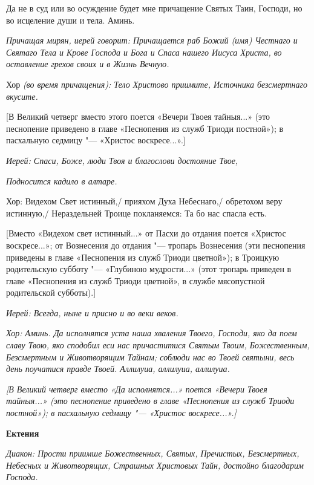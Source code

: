   Да не в суд или во осуждение будет мне причащение Святых Таин, Господи, но во исцеление души и тела. Аминь.


\medskip


 


\itshape  Причащая мирян, иерей говори\normalfont{}т: Причащается раб Божий (имя) Честнаго и Святаго Тела и Крове Господа и Бога и Спаса нашего Иисуса Христа, во оставление грехов своих и в Жизнь Вечную. 


Хор \itshape (во время причащения)\normalfont{}: Тело Христово приимите, Источника безсмертнаго вкусите.


 [В Великий четверг вместо этого поется «Вечери Твоея тайныя...» (это песнопение приведено в главе «Песнопения из служб Триоди постной»); в пасхальную седмицу "--- «Христос воскресе...».]


 \itshape Иерей:\normalfont{} Спаси, Боже, люди Твоя и благослови достояние Твое, 


\itshape Подносится кадило в алтаре.\normalfont{} 


      Хор: Видехом Свет истинный,/ прияхом Духа Небеснаго,/ обретохом веру истинную,/ Нераздельней Троице покланяемся: Та бо нас спасла есть.


      [Вместо «Видехом свет истинный...» от Пасхи до отдания поется «Христос воскресе...»; от Вознесения до отдания "--- тропарь Вознесения (эти песнопения приведены в главе «Песнопения из служб Триоди цветной»); в Троицкую родительскую субботу "--- «Глубиною мудрости...» (этот тропарь приведен в главе «Песнопения из служб Триоди цветной», в службе мясопустной родительской субботы).]


\itshape  Иерей:\normalfont{} Всегда, ныне и присно и во веки веков.


\itshape  Хор:\normalfont{} Аминь. Да исполнятся уста наша хваления Твоего, Господи, яко да поем славу Твою, яко сподобил еси нас причаститися Святым Твоим, Божественным, Безсмертным и Животворящим Тайнам; соблюди нас во Твоей святыни, весь день поучатися правде Твоей. Аллилуиа, аллилуиа, аллилуиа. 


\itshape [В Великий четверг вмест\normalfont{}о «Да исполнятся...» поется «Вечери Твоея тайныя...» (это песнопение приведено в главе «Песнопения из служб Триоди постной»); в пасхальную седмицу "--- «Христос воскресе...».]


\medskip


 \bfseries Ектения \normalfont{}


\itshape  Диакон:\normalfont{} Прости приимше Божественных, Святых, Пречистых, Безсмертных, Небесных и Животворящих, Страшных Христовых Тайн, достойно благодарим Господа. \itshape 


